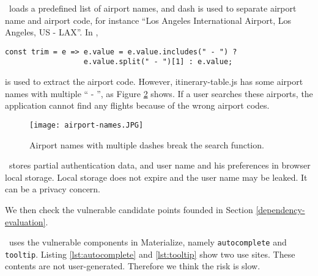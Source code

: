 \documentclass[12pt, a4paper]{article}
\newcommand{\code}[1]{\texttt{#1}}
\begin{document}
\begin{figure}
\centering
{}
\label{fig:run}
\end{figure}




\theproject\ loads a predefined list of airport names, and dash is used to separate airport name and airport code, for instance ``Los Angeles International Airport, Los Angeles, US - LAX''. In , 
\begin{lstlisting}
const trim = e => e.value = e.value.includes(" - ") ?
                  e.value.split(" - ")[1] : e.value;
\end{lstlisting}
is used to extract the airport code. However, itinerary-table.js has some airport names with multiple `` - '', as Figure \ref{fig:airport} shows. If a user searches these airports, the application cannot find any flights because of the wrong airport codes.

\begin{figure}[ht]
\centering
\texttt{[image: airport-names.JPG]}
\caption{Airport names with multiple dashes break the search function.}
\label{fig:airport}
\end{figure}


\theproject\ stores partial authentication data, and user name and his preferences in browser local storage. Local storage does not expire and the user name may be leaked. It can be a privacy concern.



We then check the vulnerable candidate points founded in Section \ref{dependency-evaluation}.

\theproject\ uses the vulnerable components in Materialize, namely \code{autocomplete} and \code{tooltip}. Listing \ref{lst:autocomplete} and \ref{lst:tooltip} show two use sites. These contents are not user-generated. Therefore we think the risk is slow.
\end{document}
